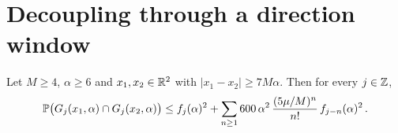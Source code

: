 \documentclass[11pt,letterpaper]{article}
\begin{document}
\section{Decoupling through a direction window}
\label{sec:decoupling}

\begin{lemma}
\label{lem:decoupling}
Let $M\ge4$, $\alpha\ge6$ and $x_1,x_2\in\R^2$ with $\lvert x_1-x_2\rvert\ge7M\alpha$. Then for every $j\in\Z$,
\begin{equation}
\label{eq:decoupling}
  \P\bigl(G_j(x_1,\alpha)\cap G_j(x_2,\alpha)\bigr)\le f_j(\alpha)^2+\sum_{n\ge1}600\,\alpha^2\,\frac{(5\mu/M)^n}{n!}\,f_{j-n}(\alpha)^2\,.
\end{equation}
\end{lemma}
\end{document}
